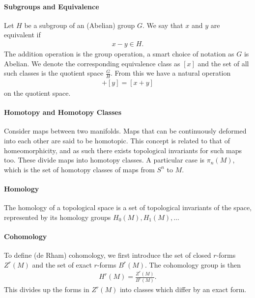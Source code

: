 \paragraph{Subgroups and Equivalence}
Let $H$ be a subgroup of an (Abelian) group $G$. We say that $x$ and $y$ are equivalent if
\begin{align*}
	x - y\in H.
\end{align*}
The addition operation is the group operation, a smart choice of notation as $G$ is Abelian. We denote the corresponding equivalence class as $[x]$ and the set of all such classes is the quotient space $\frac{G}{H}$. From this we have a natural operation
\begin{align*}
	[x] + [y] = [x + y]
\end{align*}
on the quotient space.

\paragraph{Homotopy and Homotopy Classes}
Consider maps between two manifolds. Maps that can be continuously deformed into each other are said to be homotopic. This concept is related to that of homeomorphicity, and as such there exists topological invariants for such maps too. These divide maps into homotopy classes. A particular case is $\pi_{n}(M)$, which is the set of homotopy classes of maps from $S^{n}$ to $M$.

\paragraph{Homology}
The homology of a topological space is a set of topological invariants of the space, represented by its homology groups $H_{0}(M), H_{1}(M), \dots$

\paragraph{Cohomology}
To define (de Rham) cohomology, we first introduce the set of closed $r$-forms $Z^{r}(M)$ and the set of exact $r$-forms $B^{r}(M)$. The cohomology group is then
\begin{align*}
	H^{r}(M) = \frac{Z^{r}(M)}{B^{r}(M)}.
\end{align*}
This divides up the forms in $Z^{r}(M)$ into classes which differ by an exact form.